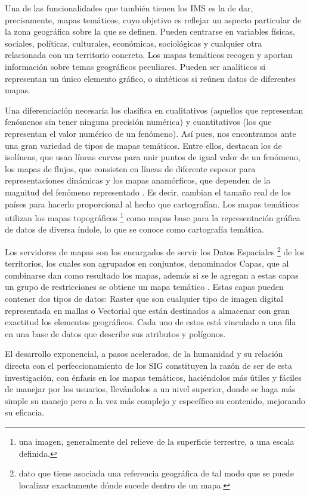 Una de las funcionalidades que tambi\'en tienen los IMS es la de dar, precisamente, mapas tem\'aticos, cuyo objetivo es reflejar un aspecto particular de la zona geogr\'afica sobre la que se definen. Pueden centrarse en variables f\'isicas, sociales, pol\'iticas, culturales, econ\'omicas, sociol\'ogicas y cualquier otra relacionada con un territorio concreto. Los mapas tem\'aticos recogen y aportan informaci\'on sobre temas geogr\'aficos peculiares. Pueden ser anal\'iticos si representan un \'unico elemento gr\'afico, o sint\'eticos si re\'unen datos de diferentes mapas. \cite{tematico}

Una diferenciaci\'on necesaria los clasifica en cualitativos (aquellos que representan fen\'omenos sin tener ninguna precisi\'on num\'erica) y cuantitativos (los que representan el valor num\'erico de un fen\'omeno). As\'i pues, nos encontramos ante una gran
variedad de tipos de mapas tem\'aticos. Entre ellos, destacan los de isol\'ineas, que usan l\'ineas curvas para unir puntos de igual valor de un fen\'omeno, los mapas de flujos, que consisten en l\'ineas de diferente espesor para representaciones din\'amicas y los mapas anam\'orficos, que dependen de la magnitud del fen\'omeno representado \cite{tematico}. Es decir, cambian el tama\~no real de los pa\'ises para hacerlo proporcional al hecho que cartograf\'ian. Los mapas tem\'aticos utilizan los mapas topogr\'aficos \footnote{una imagen, generalmente del relieve de la superficie terrestre, a una escala definida.} como mapas base para la representaci\'on gr\'afica de datos de diversa \'indole, lo que se conoce como cartograf\'ia tem\'atica.

Los servidores de mapas son los encargados de servir los Datos Espaciales \footnote{dato que tiene asociada una referencia geogr\'afica de tal modo que se puede localizar exactamente d\'onde sucede dentro de un mapa.} de los territorios, los cuales son agrupados en conjuntos, denominados Capas, que al combinarse dan como resultado los mapas, adem\'as si se le agregan a estas capas un grupo de restricciones se obtiene un mapa tem\'atico \cite{MP}. Estas capas pueden contener
dos tipos de datos: Raster que son cualquier tipo de imagen digital representada en mallas o Vectorial que est\'an destinados a almacenar con gran exactitud los elementos geogr\'aficos. Cada uno de estos est\'a vinculado a una fila en una base de datos que
describe sus atributos y pol\'igonos.

El desarrollo exponencial, a pasos acelerados, de la humanidad y su relaci\'on directa con el perfeccionamiento de los SIG constituyen la raz\'on de ser de esta investigaci\'on, con \'enfasis en los mapas tem\'aticos, haci\'endolos m\'as \'utiles y f\'aciles de manejar por los usuarios, llev\'andolos a un nivel superior, donde se haga m\'as simple su manejo pero a la vez m\'as complejo y espec\'ifico su contenido, mejorando su eficacia.



